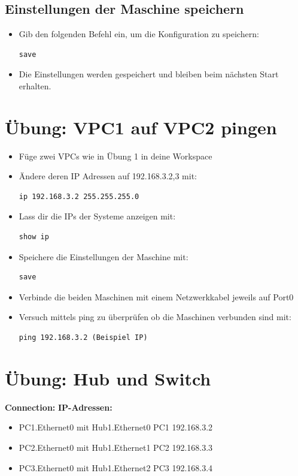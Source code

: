 \documentclass[12pt, a4paper]{article}\usepackage{listings}
\begin{document}
\subsection{Einstellungen der Maschine speichern}
\begin{itemize}
    \item Gib den folgenden Befehl ein, um die Konfiguration zu speichern:
    \begin{verbatim}
save
    \end{verbatim}
    \item Die Einstellungen werden gespeichert und bleiben beim nächsten Start erhalten.
\end{itemize}

\newpage

\section{Übung: VPC1 auf VPC2 pingen}
\begin{itemize}
	\item Füge zwei VPCs wie in Übung 1 in deine Workspace
	\item Ändere deren IP Adressen auf 192.168.3.{2,3} mit:
		\begin{verbatim}
ip 192.168.3.2 255.255.255.0
		\end{verbatim}
	\item Lass dir die IPs der Systeme anzeigen mit:
		\begin{verbatim} 
show ip 
		\end{verbatim}
	\item Speichere die Einstellungen der Maschine mit:
		\begin{verbatim} 
save 
		\end{verbatim}			
	\item Verbinde die beiden Maschinen mit einem Netzwerkkabel jeweils auf Port0
	\item Versuch mittels ping zu überprüfen ob die Maschinen verbunden sind mit:
		\begin{verbatim}
ping 192.168.3.2 (Beispiel IP)
		\end{verbatim}
\end{itemize}

\newpage

\section{Übung: Hub und Switch}
\textbf{Connection:} \quad \textbf{IP-Adressen:}
\begin{itemize}
  \item PC1.Ethernet0 mit Hub1.Ethernet0 \quad PC1 192.168.3.2
  \item PC2.Ethernet0 mit Hub1.Ethernet1 \quad PC2 192.168.3.3
  \item PC3.Ethernet0 mit Hub1.Ethernet2 \quad PC3 192.168.3.4
\end{itemize}
\end{document}
